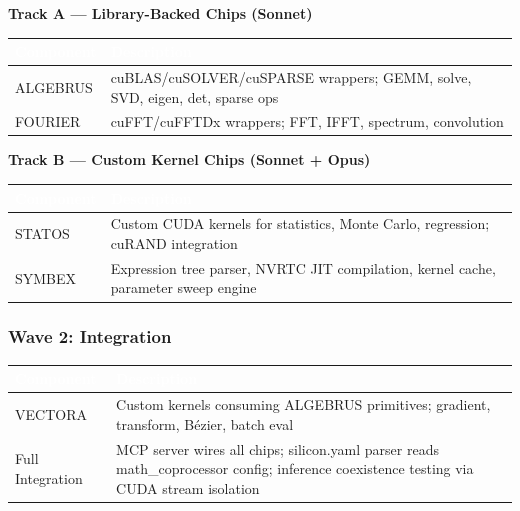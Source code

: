 \documentclass[11pt,letterpaper]{article}
\newcommand{\tableheader}[1]{\textbf{\sffamily\textcolor{white}{#1}}}
\begin{document}
\textbf{Track A --- Library-Backed Chips (Sonnet)}

\begin{center}
\begin{tabularx}{\textwidth}{L{2.5cm}X}
\toprule
{}
\tableheader{Component} & \tableheader{Description} \\
\midrule
ALGEBRUS & cuBLAS/cuSOLVER/cuSPARSE wrappers; GEMM, solve, SVD, eigen, det, sparse ops \\
FOURIER & cuFFT/cuFFTDx wrappers; FFT, IFFT, spectrum, convolution \\
\bottomrule
\end{tabularx}
\end{center}

\textbf{Track B --- Custom Kernel Chips (Sonnet + Opus)}

\begin{center}
\begin{tabularx}{\textwidth}{L{2.5cm}X}
\toprule
{}
\tableheader{Component} & \tableheader{Description} \\
\midrule
STATOS & Custom CUDA kernels for statistics, Monte Carlo, regression; cuRAND integration \\
SYMBEX & Expression tree parser, NVRTC JIT compilation, kernel cache, parameter sweep engine \\
\bottomrule
\end{tabularx}
\end{center}

\subsubsection{Wave 2: Integration}

\begin{center}
\begin{tabularx}{\textwidth}{L{2.5cm}X}
\toprule
{}
\tableheader{Component} & \tableheader{Description} \\
\midrule
VECTORA & Custom kernels consuming ALGEBRUS primitives; gradient, transform, Bézier, batch eval \\
Full Integration & MCP server wires all chips; silicon.yaml parser reads math\_coprocessor config; inference coexistence testing via CUDA stream isolation \\
\bottomrule
\end{tabularx}
\end{center}
\end{document}
